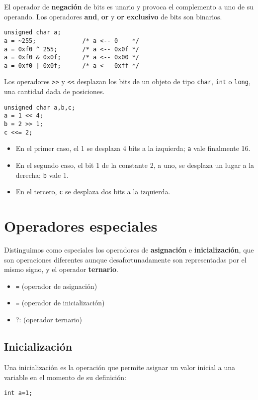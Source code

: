 \begin{ejemplo}
El operador de \textbf{negación} de bits es unario y provoca el complemento a uno de su operando. Los operadores \textbf{and}, \textbf{or} y \textbf{or exclusivo} de bits son binarios.
\begin{lstlisting}
unsigned char a;
a = ~255;             /* a <-- 0    */
a = 0xf0 ^ 255;       /* a <-- 0x0f */
a = 0xf0 & 0x0f;      /* a <-- 0x00 */
a = 0xf0 | 0x0f;      /* a <-- 0xff */                
\end{lstlisting}
\end{ejemplo}

\begin{ejemplo}
Los operadores \lstinline{>>} y \lstinline{<<} desplazan los bits de un objeto de tipo \lstinline{char}, \lstinline{int} o \lstinline{long}, una cantidad dada de posiciones. 
\begin{lstlisting}
unsigned char a,b,c;
a = 1 << 4;
b = 2 >> 1;
c <<= 2;    
\end{lstlisting}
\begin{itemize}
	\item En el primer caso, el 1 se desplaza 4 bits a la izquierda; \lstinline{a} vale finalmente 16. 
	\item En el segundo caso, el bit 1 de la constante 2, a uno, se desplaza un lugar a la derecha; \lstinline{b} vale 1. 
	\item En el tercero, \lstinline{c} se desplaza dos bits a la izquierda. 
\end{itemize}
\end{ejemplo}


\section{Operadores especiales}

Distinguimos como especiales los operadores de \textbf{asignación} e \textbf{inicialización}, que son operaciones diferentes aunque desafortunadamente son representadas por el mismo signo, y el operador \textbf{ternario}.

\begin{itemize}
	\item \lstinline{=} (operador de asignación)
	\item \lstinline{=} (operador de inicialización)
	\item ?: (operador ternario)
\end{itemize}


\subsection{Inicialización}
Una inicialización es la operación que permite asignar un valor inicial a una variable en el momento de su definición: 
\begin{lstlisting}
int a=1;
\end{lstlisting}


